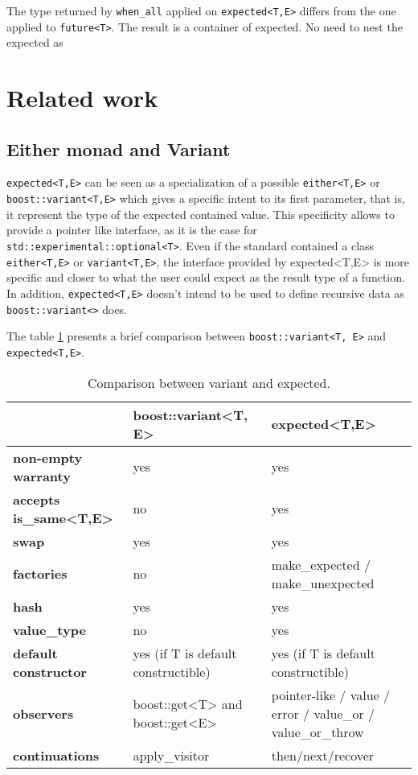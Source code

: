 \documentclass[a4paper,10pt]{article}
\newcommand{\cpp}[1]{\lstinline{#1}}
\begin{document}
The type returned by \cpp{when_all} applied on \cpp{expected<T,E>} differs from the one applied to  \cpp{future<T>}. The result is a container of expected. No need to nest the expected as 



\section{Related work}

\subsection{Either monad and Variant}

\cpp{expected<T,E>} can be seen as a specialization of a possible \cpp{either<T,E>} or \cpp{boost::variant<T,E>} which gives a specific intent to its first parameter, that is, it represent the type of the expected contained value. This specificity allows to provide a pointer like interface, as it is the case for \cpp{std::experimental::optional<T>}. Even if the standard contained a class \cpp{either<T,E>} or \cpp{variant<T,E>}, the interface provided by expected<T,E> is more specific and closer to what the user could expect as the result type of a function. In addition, \cpp{expected<T,E>} doesn't intend to be used to define recursive data as \cpp{boost::variant<>} does.

The table \ref{comp-variant} presents a brief comparison between \cpp{boost::variant<T, E>} and \cpp{expected<T,E>}.

\begin{table}
\bgroup
\def\arraystretch{1.5}
\begin{tabular}
{|l|>{\raggedright\arraybackslash}p{6cm}|>{\raggedright\arraybackslash}p{6cm}|}
\hline
                    & \textbf{boost::variant<T, E>} & \textbf{expected<T,E>}  \\
\hline
\textbf{non-empty warranty} & yes & yes \\
\hline
\textbf{accepts is_same<T,E>} & no & yes \\
\hline
\textbf{swap} & yes & yes \\
\hline
\textbf{factories} & no & make_expected / make_unexpected  \\
\hline
\textbf{hash} & yes & yes  \\
\hline
\textbf{value_type} & no & yes  \\
\hline
\textbf{default constructor} & yes (if T is default constructible) & yes (if T is default constructible)  \\
\hline
\textbf{observers} & boost::get<T> and boost::get<E> & pointer-like / value / error / value_or / value_or_throw \\
\hline
\textbf{continuations} & apply_visitor & then/next/recover  \\
\hline
\end{tabular}
\egroup
\caption{Comparison between variant and expected.}
\label{comp-variant}
\end{table}
\end{document}
